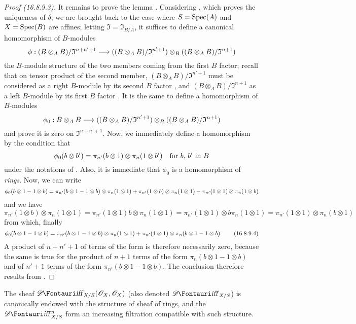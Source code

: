 \begin{proof}[Proof (16.8.9.3)]
It remains to prove the lemma .
Considering , which proves the uniqueness of $\delta$, we are brought back to the case where $S = \operatorname{Spec}(A)$ and $X = \operatorname{Spec}(B)$ are affines;
letting $\mathfrak{I} = \mathfrak{I}_{B/A}$, it suffices to define a canonical homomorphism of $B$-modules
\[
  \vphi: (B \otimes_A B)/\mathfrak{I}^{n+n'+1} \to ((B \otimes_A B)/\mathfrak{I}^{n' + 1}) \otimes_B ((B \otimes_A B)/\mathfrak{I}^{n + 1})
\]
the $B$-module structure of the two members coming from the first $B$ factor;
recall that on tensor product of the second member, $(B \otimes_A B)/\mathfrak{I}^{n' + 1}$ must be considered
as a right $B$-module by its second $B$ factor , and $(B \otimes_A B)/\mathfrak{I}^{n + 1}$ as a left $B$-module by its first $B$ factor .
It is the same to define a homomorphism of $B$-modules
\[
  \vphi_0: B \otimes_A B \to ((B \otimes_A B)/\mathfrak{I}^{n' + 1}) \otimes_B ((B \otimes_A B)/\mathfrak{I}^{n + 1})
\]
and prove it is zero on $\mathfrak{I}^{n+n'+1}$.
Now, we immediately define a homomorphism by the condition that
\[
  \phi_0(b \otimes b') = \pi_{n'}(b \otimes 1) \otimes \pi_n(1 \otimes b') \quad \text{for $b$, $b'$ in $B$}
\]
under the notations of .
Also, it is immediate that $\phi_0$ is a homomorphism of \emph{rings}.
Now, we can write 
\[
  \phi_0(b \otimes 1 - 1 \otimes b) = \pi_{n'}(b \otimes 1 - 1 \otimes b) \otimes \pi_n(1 \otimes 1) + \pi_{n'}(1 \otimes b) \otimes \pi_n(1 \otimes 1) - \pi_{n'}(1 \otimes 1) \otimes \pi_n(1 \otimes b)
\]
and we have 
\[
  \pi_{n'}(1 \otimes b) \otimes \pi_n(1 \otimes 1) = \pi_{n'}(1 \otimes 1) b \otimes \pi_n(1 \otimes 1) = \pi_{n'}(1 \otimes 1) \otimes b \pi_n(1 \otimes 1) = \pi_{n'}(1 \otimes 1) \otimes \pi_n(b \otimes 1)
\]
from which, finally
\[
  \label{IV.16.8.9.4}
  \phi_0(b \otimes 1 - 1 \otimes b) = \pi_{n'}(b \otimes 1 - 1 \otimes b) \otimes \pi_n(1 \otimes 1) + \pi_{n'}(1 \otimes 1) \otimes \pi_n(b \otimes 1 - 1 \otimes b). 
  \tag{16.8.9.4}
\]
A product of $n + n' + 1$ of terms of the form  is therefore necessarily zero, because the same is true for the product of $n+1$ terms of the form $\pi_n(b \otimes 1 - 1 \otimes b)$ and of $n' + 1$ terms of the form $\pi_{n'}(b \otimes 1 - 1 \otimes b)$.
The conclusion therefore results from .
\end{proof}

\begin{corollary}[16.8.10]
\label{IV.16.8.10}
The sheaf $\shDiff_{X/S}(\sh{O}_X, \sh{O}_X)$ (also denoted $\shDiff_{X/S}$) is canonically endowed with the structure of sheaf of rings, and the $\shDiff_{X/S}^n$ form an increasing filtration compatible with such structure.
\end{corollary}

